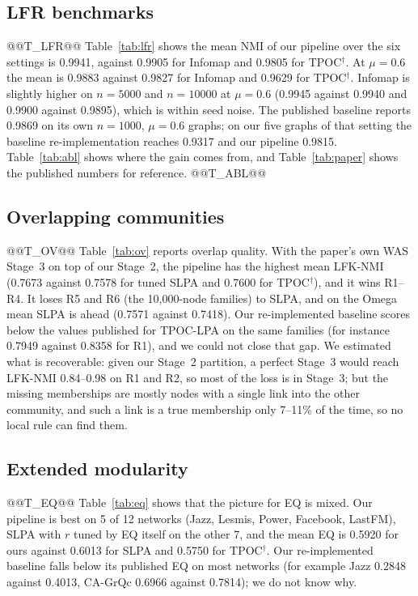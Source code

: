 \documentclass[conference]{IEEEtran}
\begin{document}
\subsection{LFR benchmarks}
@@T_LFR@@
Table~\ref{tab:lfr} shows the mean NMI of our pipeline over the six settings is 0.9941, against 0.9905 for Infomap and 0.9805 for TPOC$^{\dagger}$. At $\mu{=}0.6$ the mean is 0.9883 against 0.9827 for Infomap and 0.9629 for TPOC$^{\dagger}$. Infomap is slightly higher on $n{=}5000$ and $n{=}10000$ at $\mu{=}0.6$ (0.9945 against 0.9940 and 0.9900 against 0.9895), which is within seed noise. The published baseline reports 0.9869 on its own $n{=}1000$, $\mu{=}0.6$ graphs; on our five graphs of that setting the baseline re-implementation reaches 0.9317 and our pipeline 0.9815. Table~\ref{tab:abl} shows where the gain comes from, and Table~\ref{tab:paper} shows the published numbers for reference.
@@T_ABL@@
\subsection{Overlapping communities}
@@T_OV@@
Table~\ref{tab:ov} reports overlap quality. With the paper's own WAS Stage~3 on top of our Stage~2, the pipeline has the highest mean LFK-NMI (0.7673 against 0.7578 for tuned SLPA and 0.7600 for TPOC$^{\dagger}$), and it wins R1--R4. It loses R5 and R6 (the 10{,}000-node families) to SLPA, and on the Omega mean SLPA is ahead (0.7571 against 0.7418). Our re-implemented baseline scores below the values published for TPOC-LPA on the same families (for instance 0.7949 against 0.8358 for R1), and we could not close that gap. We estimated what is recoverable: given our Stage~2 partition, a perfect Stage~3 would reach LFK-NMI 0.84--0.98 on R1 and R2, so most of the loss is in Stage~3; but the missing memberships are mostly nodes with a single link into the other community, and such a link is a true membership only 7--11\% of the time, so no local rule can find them.

\subsection{Extended modularity}
@@T_EQ@@
Table~\ref{tab:eq} shows that the picture for EQ is mixed. Our pipeline is best on 5 of 12 networks (Jazz, Lesmis, Power, Facebook, LastFM), SLPA with $r$ tuned by EQ itself on the other 7, and the mean EQ is 0.5920 for ours against 0.6013 for SLPA and 0.5750 for TPOC$^{\dagger}$. Our re-implemented baseline falls below its published EQ on most networks (for example Jazz 0.2848 against 0.4013, CA-GrQc 0.6966 against 0.7814); we do not know why.
\end{document}
